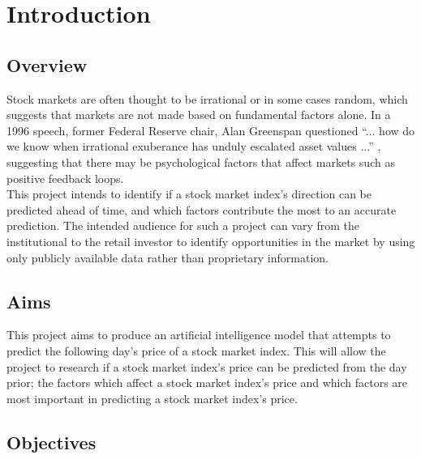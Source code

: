 \chapter{Introduction} \label{chap:introduction}

\section{Overview}

Stock markets are often thought to be irrational or in some cases random,
which suggests that markets are not made based on fundamental factors alone.
In a 1996 speech, former Federal Reserve chair, Alan Greenspan questioned ``... how do we know when irrational exuberance has unduly escalated asset
values ...'' \parencite{greenspan1996}, suggesting that there may be
psychological factors that affect markets such as positive feedback loops.\\

This project intends to identify if a stock market index's direction can be predicted ahead
of time, and which factors contribute the most to an accurate prediction.
The intended audience for such a project can vary from the institutional to
the retail investor to identify opportunities in the market by using only
publicly available data rather than proprietary information.

\section{Aims}

This project aims to produce an artificial intelligence model that
attempts to predict the following day's price of a stock market index. This will
allow the project to research if a stock market index's price can be predicted
from the day prior; the factors which affect a stock market index's price and which
factors are most important in predicting a stock market index's price.

\section{Objectives}

